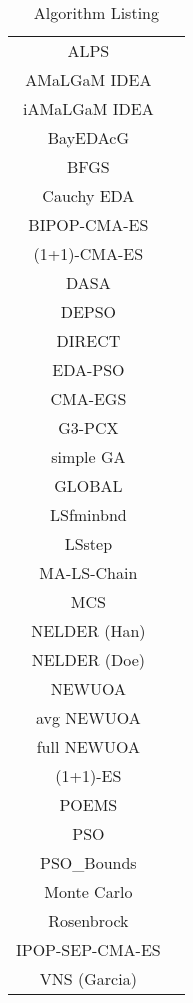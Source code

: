 \documentclass[a4paper,10pt]{article}
\begin{document}
\begin{table}
\caption{\label{tab:algorithms}Algorithm Listing}
\begin{tabular}{cc}
ALPS & \cite{Hornby:2009} \\
AMaLGaM IDEA & \cite{DBLP:conf/gecco/BosmanGT09} \\
iAMaLGaM IDEA & \cite{DBLP:conf/gecco/BosmanGT09} \\
BayEDAcG & \cite{DBLP:conf/gecco/Gallagher09} \\
BFGS & \cite{DBLP:conf/gecco/Ros09} \\
Cauchy EDA & \cite{DBLP:conf/gecco/Posik09} \\
BIPOP-CMA-ES & \cite{DBLP:conf/gecco/Hansen09} \\
(1+1)-CMA-ES & \cite{DBLP:conf/gecco/AugerH09} \\
DASA & \cite{DBLP:conf/gecco/KorosecS09} \\
DEPSO & \cite{DBLP:conf/gecco/Garcia-NietoAA09} \\
DIRECT & \cite{DBLP:conf/gecco/Posik09a} \\
EDA-PSO & \cite{DBLP:conf/gecco/El-AbdK09} \\
CMA-EGS & \cite{Finck:2009} \\
G3-PCX & \cite{DBLP:conf/gecco/Posik09b} \\
simple GA & \cite{DBLP:conf/gecco/Nicolau09} \\
GLOBAL & \cite{Pal:2009a} \\
LSfminbnd & \cite{DBLP:conf/gecco/Posik09c} \\
LSstep & \cite{DBLP:conf/gecco/Posik09c} \\
MA-LS-Chain & \cite{DBLP:conf/gecco/MolinaLH09} \\
MCS & \cite{Huyer:2009b} \\
NELDER (Han) & \cite{DBLP:conf/gecco/Hansen09b} \\
NELDER (Doe) & \cite{DBLP:conf/gecco/DoerrFSW09} \\
NEWUOA & \cite{DBLP:conf/gecco/Ros09b} \\
avg NEWUOA & \cite{DBLP:conf/gecco/Ros09b} \\
full NEWUOA & \cite{DBLP:conf/gecco/Ros09b} \\
(1+1)-ES & \cite{DBLP:conf/gecco/Auger09} \\
POEMS & \cite{DBLP:conf/gecco/Kubalik09a} \\
PSO & \cite{DBLP:conf/gecco/El-AbdK09a} \\
PSO\_Bounds & \cite{DBLP:conf/gecco/El-AbdK09b} \\
Monte Carlo & \cite{DBLP:conf/gecco/AugerR09} \\
Rosenbrock & \cite{DBLP:conf/gecco/Posik09d} \\
IPOP-SEP-CMA-ES & \cite{DBLP:conf/gecco/Ros09d} \\
VNS (Garcia) & \cite{DBLP:conf/gecco/Garcia-MartinezL09} 
\end{tabular}
\end{table}



\end{document}
